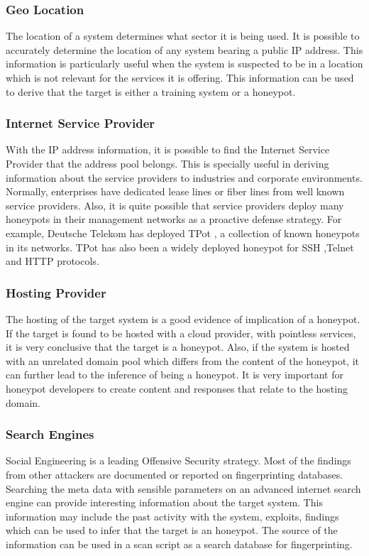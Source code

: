 \documentclass[letterpaper, 10 pt, conference]{ieeeconf}  %
\begin{document}
\subsubsection{Geo Location}
The location of a system determines what sector it is being used. It is possible to accurately determine the location of any system bearing a public IP address. This information is particularly useful when the system is suspected to be in a location which is not relevant for the services it is offering. This information can be used to derive that the target is either a training system or a honeypot. 
\newline
\subsubsection{Internet Service Provider}
With the IP address information, it is possible to find the Internet Service Provider that the address pool belongs. This is specially useful in deriving information about the service providers to industries and corporate environments. Normally, enterprises have dedicated lease lines or fiber lines from well known service providers. Also, it is quite possible that service providers deploy many honeypots in their management networks as a proactive defense strategy. For example, Deutsche Telekom has deployed TPot \cite{TPot}, a collection of known honeypots in its networks. TPot has also been a widely deployed honeypot for SSH ,Telnet and HTTP protocols. 
\newline
\subsubsection{Hosting Provider}
The hosting of the target system is a good evidence of implication of a honeypot. If the target is found to be hosted with a cloud provider, with pointless services, it is very conclusive that the target is a honeypot. Also, if the system is hosted with an unrelated domain pool which differs from the content of the honeypot, it can further lead to the inference of being a honeypot. It is very important for honeypot developers to create content and responses that relate to the hosting domain.  
\newline
\subsubsection{Search Engines}
Social Engineering is a leading Offensive Security strategy. Most of the findings from other attackers are documented or reported on fingerprinting databases. Searching the meta data with sensible parameters on an advanced internet search engine can provide interesting information about the target system. This information may include the past activity with the system, exploits, findings which can be used to infer that the target is an honeypot. The source of the information can be used in a scan script as a search database for fingerprinting. 
\newline
\end{document}
